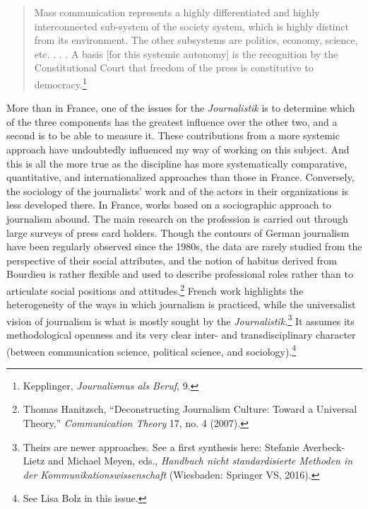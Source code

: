 \documentclass{tufte-handout}
\begin{document}
\begin{quote}
Mass communication represents a highly differentiated and highly
interconnected sub-system of the society system, which is highly
distinct from its environment. The other subsystems are politics,
economy, science, etc. . . . A basis {[}for this systemic autonomy{]} is
the recognition by the Constitutional Court that freedom of the press is
constitutive to democracy.\footnote{Kepplinger, \emph{Journalismus als
  Beruf}, 9.}
\end{quote}

More than in France, one of the issues for the \emph{Journalistik} is to
determine which of the three components has the greatest influence over
the other two, and a second is to be able to measure it. These
contributions from a more systemic approach have undoubtedly influenced
my way of working on this subject. And this is all the more true as the
discipline has more systematically comparative, quantitative, and
internationalized approaches than those in France. Conversely, the
sociology of the journalists' work and of the actors in their
organizations is less developed there. In France, works based on a
sociographic approach to journalism abound. The main research on the
profession is carried out through large surveys of press card holders.
Though the contours of German journalism have been regularly observed
since the 1980s, the data are rarely studied from the perspective of
their social attributes, and the notion of habitus derived from Bourdieu
is rather flexible and used to describe professional roles rather than
to articulate social positions and attitudes.\footnote{Thomas Hanitzsch,
  ``Deconstructing Journalism Culture: Toward a Universal Theory,''
  \emph{Communication Theory} 17, no. 4 (2007).} French work highlights
the heterogeneity of the ways in which journalism is practiced, while
the universalist vision of journalism is what is mostly sought by the
\emph{Journalistik.}\footnote{Theirs are newer approaches. See a first
  synthesis here: Stefanie Averbeck-Lietz and Michael Meyen, eds.,
  \emph{Handbuch nicht standardisierte Methoden in der
  Kommunikationswissenschaft} (Wiesbaden: Springer VS, 2016).} It
assumes its methodological openness and its very clear inter- and
transdisciplinary character (between communication science, political
science, and sociology).\footnote{See Lisa Bolz in this issue.}
\end{document}

